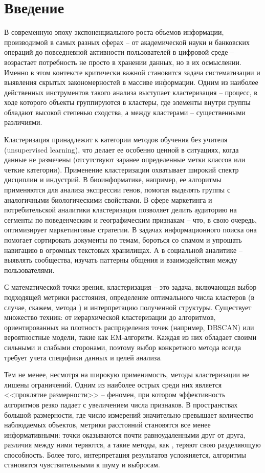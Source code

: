 \section{Введение}

    В современную эпоху экспоненциального роста объемов информации, производимой в самых разных сферах -- от академической науки и банковских операций до повседневной активности пользователей в цифровой среде -- возрастает потребность не просто в хранении данных, но в их осмыслении. Именно в этом контексте критически важной становится задача систематизации и выявления скрытых закономерностей в массиве информации. Одним из наиболее действенных инструментов такого анализа выступает кластеризация -- процесс, в ходе которого объекты группируются в кластеры, где элементы внутри группы обладают высокой степенью сходства, а между кластерами -- существенными различиями.

    Кластеризация принадлежит к категории методов обучения без учителя (unsupervised learning), что делает ее особенно ценной в ситуациях, когда данные не размечены (отсутствуют заранее определенные метки классов или четкие категории). Применение кластеризации охватывает широкий спектр дисциплин и индустрий. В биоинформатике, например, ее алгоритмы применяются для анализа экспрессии генов, помогая выделять группы с аналогичными биологическими свойствами. В сфере маркетинга и потребительской аналитики кластеризация позволяет делить аудиторию на сегменты по поведенческим и географическим признакам -- что, в свою очередь, оптимизирует маркетинговые стратегии. В задачах информационного поиска она помогает сортировать документы по темам, бороться со спамом и упрощать навигацию в огромных текстовых хранилищах. А в социальной аналитике -- выявлять сообщества, изучать паттерны общения и взаимодействия между пользователями.

    С математической точки зрения, кластеризация -- это задача, включающая выбор подходящей метрики расстояния, определение оптимального числа кластеров (в случае, скажем, метода \kmeans{}) и интерпретацию полученной структуры. Существует множество техник: от иерархической кластеризации до алгоритмов, ориентированных на плотность распределения точек (например, DBSCAN) или вероятностные модели, такие как EM-алгоритм. Каждая из них обладает своими сильными и слабыми сторонами, поэтому выбор конкретного метода всегда требует учета специфики данных и целей анализа.

    Тем не менее, несмотря на широкую применимость, методы кластеризации не лишены ограничений. Одним из наиболее острых среди них является <<проклятие размерности>> -- феномен, при котором эффективность алгоритмов резко падает с увеличением числа признаков. В пространствах большой размерности, где число измерений значительно превышает количество наблюдаемых объектов, метрики расстояний становятся все менее информативными: точки оказываются почти равноудаленными друг от друга, различия между ними теряются, а такие методы, как \kmeans{}, теряют свою разделяющую способность. Более того, интерпретация результатов усложняется, алгоритмы становятся чувствительными к шуму и выбросам.

